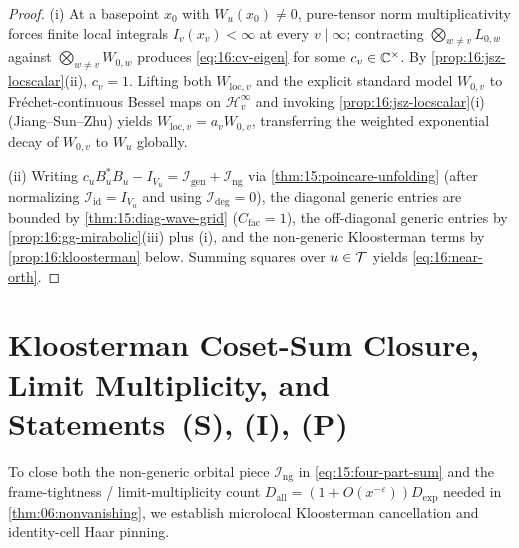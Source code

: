 \begin{proof}
(i) At a basepoint $x_0$ with $W_u(x_0) \neq 0$, pure-tensor norm multiplicativity forces finite local integrals $I_v(x_v) < \infty$ at every $v \mid \infty$; contracting $\bigotimes_{w \neq v} L_{0, w}$ against $\bigotimes_{w \neq v} W_{0, w}$ produces \eqref{eq:16:cv-eigen} for some $c_v \in \mathbb{C}^\times$. By \cref{prop:16:jsz-locscalar}(ii), $c_v = 1$. Lifting both $W_{\mathrm{loc}, v}$ and the explicit standard model $W_{0, v}$ to Fr\'echet-continuous Bessel maps on $\mathcal{H}_v^\infty$ and invoking \cref{prop:16:jsz-locscalar}(i) (Jiang--Sun--Zhu) yields $W_{\mathrm{loc}, v} = a_v W_{0, v}$, transferring the weighted exponential decay of $W_{0, v}$ to $W_u$ globally.

(ii) Writing $c_u B_u^* B_u - I_{V_u} = \mathcal{I}_{\mathrm{gen}} + \mathcal{I}_{\mathrm{ng}}$ via \cref{thm:15:poincare-unfolding} (after normalizing $\mathcal{I}_{\mathrm{id}} = I_{V_u}$ and using $\mathcal{I}_{\mathrm{deg}} = 0$), the diagonal generic entries are bounded by \cref{thm:15:diag-wave-grid} ($C_{\mathrm{fac}} = 1$), the off-diagonal generic entries by \cref{prop:16:gg-mirabolic}(iii) plus (i), and the non-generic Kloosterman terms by \cref{prop:16:kloosterman} below. Summing squares over $u \in \mathcal{T}$ yields \eqref{eq:16:near-orth}.
\end{proof}

\section{Kloosterman Coset-Sum Closure, Limit Multiplicity, and Statements~(S), (I), (P)}
\label{sec:16:kloosterman-sip}

To close both the non-generic orbital piece $\mathcal{I}_{\mathrm{ng}}$ in \eqref{eq:15:four-part-sum} and the frame-tightness / limit-multiplicity count $D_{\mathrm{all}} = (1 + O(x^{-\varepsilon})) D_{\mathrm{exp}}$ needed in \cref{thm:06:nonvanishing}, we establish microlocal Kloosterman cancellation and identity-cell Haar pinning.

